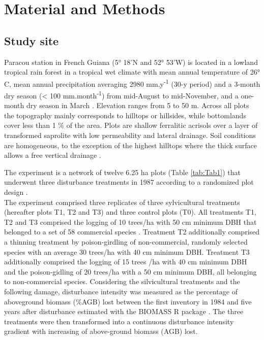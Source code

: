 \documentclass[fleqn,10pt]{ArtEcoFoG} %
\begin{document}
\section{Material and Methods}\label{material-and-methods}

\subsection{Study site}\label{study-site}

Paracou station in French Guiana (5° 18'N and 52° 53'W) is located in a
lowland tropical rain forest in a tropical wet climate with mean annual
temperature of 26° C, mean annual precipitation averaging 2980
mm.y\textsuperscript{-1} (30-y period) and a 3-month dry season
(\textless{} 100 mm.month\textsuperscript{-1}) from mid-August to
mid-November, and a one-month dry season in March \citep{Wagner2011}.
Elevation ranges from 5 to 50 m. Across all plots the topography mainly
corresponds to hilltops or hillsides, while bottomlands cover less than
1 \% of the area. Plots are shallow ferralitic acrisols over a layer of
transformed saprolite with low permeability and lateral drainage. Soil
conditions are homogeneous, to the exception of the highest hilltops
where the thick surface allows a free vertical drainage
\citep{Gourlet-Fleury2004}.

The experiment is a network of twelve 6.25 ha plots (Table
\ref{tab:Tab1}) that underwent three disturbance treatments in 1987
according to a randomized plot design \citep{Gourlet-Fleury2004}.\\
The experiment comprised three replicates of three sylvicultural
treatments (hereafter plots T1, T2 and T3) and three control plots (T0).
All treatments T1, T2 and T3 comprised the logging of 10 trees/ha with
50 cm minimum DBH that belonged to a set of 58 commercial species
\citep{Gourlet-Fleury2004}. Treatment T2 additionally comprised a
thinning treatment by poison-girdling of non-commercial, randomly
selected species with an average 30 trees/ha with 40 cm minimum DBH.
Treatment T3 additionally comprised the logging of 15 trees /ha with 40
cm minimum DBH and the poison-gidling of 20 trees/ha with a 50 cm
minimum DBH, all belonging to non-commercial species. Considering the
silvicultural treatments and the following damage, disturbance intensity
was measured as the percentage of aboveground biomass (\%AGB) lost
between the first inventory in 1984 and five years after disturbance
\citep{Piponiot2016} estimated with the BIOMASS R package
\citep{Rejou2017}. The three treatments were then transformed into a
continuous disturbance intensity gradient with increasing of
above-ground biomass (AGB) lost.
\end{document}
